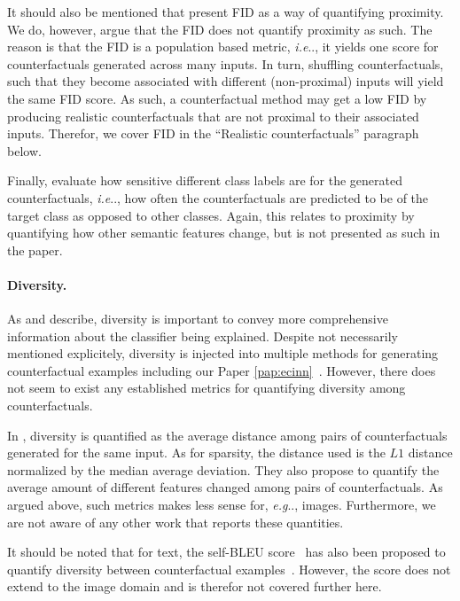 \documentclass[11pt,a4paper,twoside,openright,final]{memoir}
\makeatletter
\DeclareRobustCommand\onedot{\futurelet\@let@token\@onedot}
\def\@onedot{\ifx\@let@token.\else.\null\fi\xspace}
\def\eg{\emph{e.g}\onedot} \def\Eg{\emph{E.g}\onedot}
\def\ie{\emph{i.e}\onedot} \def\Ie{\emph{I.e}\onedot}
\newcommand*{\paperref}[1]{Paper \hyperref[#1]{\ref{#1}}}
\makeatother
\begin{document}
It should also be mentioned that \cite{Rodriguez2021} present FID as a way of quantifying proximity.
We do, however, argue that the FID does not quantify proximity as such.
The reason is that the FID is a population based metric, \ie, it yields one score for counterfactuals generated across many inputs.
In turn, shuffling counterfactuals, such that they become associated with different (non-proximal) inputs will yield the same FID score.
As such, a counterfactual method may get a low FID by producing realistic counterfactuals that are not proximal to their associated inputs.
Therefor, we cover FID in the ``Realistic counterfactuals'' paragraph below. 

Finally, \citet{Singla2019} evaluate how sensitive different class labels are for the generated counterfactuals, \ie, how often the counterfactuals are predicted to be of the target class as opposed to other classes.
Again, this relates to proximity by quantifying how other semantic features change, but is not presented as such in the paper. 

\paragraph{Diversity.}
As \citet{Mothilal2020} and \citet{Wachter2017} describe, diversity is important to convey more comprehensive information about the classifier being explained.
Despite not necessarily mentioned explicitely, diversity is injected into multiple methods for generating counterfactual examples including our \paperref{pap:ecinn}~\cite{Joshi2018, Singla2019, Rodriguez2021}. 
However, there does not seem to exist any established metrics for quantifying diversity among counterfactuals.

In \cite{Mothilal2020}, diversity is quantified as the average distance among pairs of counterfactuals generated for the same input. 
As for sparsity, the distance used is the $L1$ distance normalized by the median average deviation.
They also propose to quantify the average amount of different features changed among pairs of counterfactuals.
As argued above, such metrics makes less sense for, \eg, images.
Furthermore, we are not aware of any other work that reports these quantities.

It should be noted that for text, the self-BLEU score~\cite{self-bleu} has also been proposed to quantify diversity between counterfactual examples~\cite{Wu2021}.
However, the score does not extend to the image domain and is therefor not covered further here.
\end{document}
